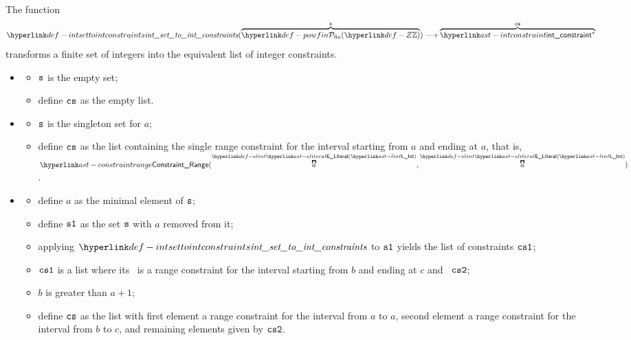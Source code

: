 \begin{mathpar}
\end{mathpar}

\hypertarget{def-intsettointconstraints}{}
The function
\[
\intsettointconstraints(\overname{\powfin{\Z}}{\vs})
\aslto \overname{\intconstraint^*}{\cs}
\]
transforms a finite set of integers into the equivalent list of integer constraints.

\ProseParagraph
\OneApplies
\begin{itemize}
  \item {}
  \begin{itemize}
    \item $\vs$ is the empty set;
    \item define $\cs$ as the empty list.
  \end{itemize}

  \item {}
  \begin{itemize}
    \item $\vs$ is the singleton set for $a$;
    \item define $\cs$ as the list containing the single range constraint for the interval starting from $a$
          and ending at $a$, that is, $\ConstraintRange(\ELInt{a}, \ELInt{a})$.
  \end{itemize}

  \item {}
  \begin{itemize}
    \item define $a$ as the minimal element of $\vs$;
    \item define $\vsone$ as the set $\vs$ with $a$ removed from it;
    \item applying $\intsettointconstraints$ to $\vsone$ yields the list of constraints $\csone$;
    \item $\csone$ is a list where its \head\ is a range constraint for the interval starting from $b$ and ending at $c$
          and \tail\ $\cstwo$;
    \item $b$ is greater than $a+1$;
    \item define $\cs$ as the list with first element a range constraint for the interval from $a$ to $a$,
          second element a range constraint for the interval from $b$ to $c$, and remaining elements given by $\cstwo$.
  \end{itemize}


\end{itemize}
